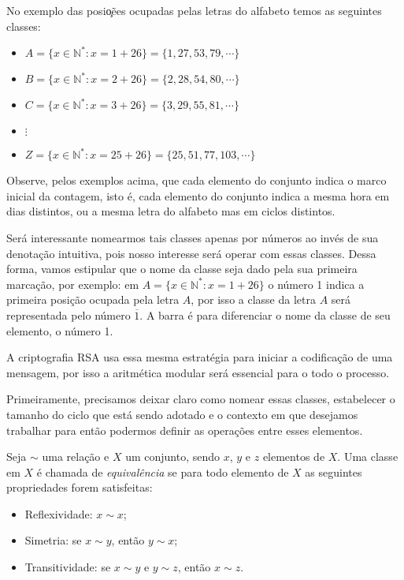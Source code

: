 No exemplo das posi\c{o}\~{e}es ocupadas pelas letras do alfabeto temos as seguintes classes: 

\begin{itemize}
	\item $A=\{x\in\mathbb{N^*}: x=1+26\}=\{1, 27, 53, 79, \cdots\}$ 
	\item $B=\{x\in\mathbb{N^*}: x=2+26\}=\{2, 28, 54, 80, \cdots\}$
	\item $C=\{x\in\mathbb{N^*}: x=3+26\}=\{3, 29, 55, 81, \cdots\}$
	\item $\vdots$
	\item $Z=\{x\in\mathbb{N^*}: x=25+26\}=\{25, 51, 77, 103, \cdots\}$
\end{itemize}

Observe, pelos exemplos acima, que cada elemento do conjunto indica o marco inicial da contagem, isto \'{e}, cada elemento do conjunto indica a mesma hora em dias distintos, ou a mesma letra do alfabeto mas em ciclos distintos.

Ser\'{a} interessante nomearmos tais classes apenas por n\'{u}meros ao inv\'{e}s de sua denota\c{c}\~{a}o intuitiva, pois nosso interesse ser\'{a} operar com essas classes. Dessa forma, vamos estipular que o nome da classe seja dado pela sua 
primeira marca\c{c}\~{a}o, por exemplo: em $A=\{x\in\mathbb{N^*}: x=1+26\}$ o n\'{u}mero 1 indica a primeira posi\c{c}\~{a}o ocupada pela letra $A$, por isso a classe da letra $A$ ser\'{a} representada pelo n\'{u}mero $\overline{1}$. A barra \'{e} 
para diferenciar o nome da classe de seu elemento, o n\'{u}mero 1. 

A criptografia RSA usa essa mesma estrat\'{e}gia para iniciar a codifica\c{c}\~{a}o de uma mensagem, por isso a aritm\'{e}tica
modular ser\'{a} essencial para o todo o processo. 
 
Primeiramente, precisamos deixar claro como nomear essas classes, estabelecer o tamanho do ciclo que est\'a sendo adotado 
e o contexto em que desejamos trabalhar para ent\~{a}o podermos definir as opera\c{c}\~{o}es entre esses elementos.
 

\begin{Df}
	Seja $\sim$ uma rela\c{c}\~{a}o e $X$ um conjunto, sendo $x$, $y$ e $z$ elementos de $X$. 
	Uma classe em $X$ \'{e} chamada de \textsl{equival\^{e}ncia} se 
	para todo elemento de $X$ as seguintes propriedades forem satisfeitas:
	\begin{itemize}
		\item Reflexividade: $x\sim x$; 		
		\item Simetria: se $x\sim y$, ent\~{a}o $y\sim x$; 
		\item Transitividade: se $x\sim y$ e $y\sim z$, ent\~{a}o $x\sim z$.
	\end{itemize}
\end{Df}   
	
